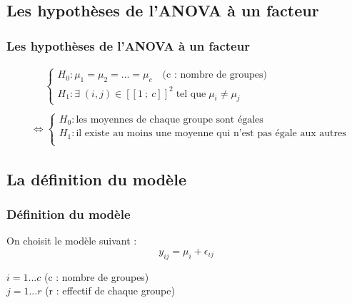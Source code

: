 \documentclass{beamer}
\begin{document}
\subsection{Les hypothèses de l'ANOVA à un facteur}
\begin{frame}
\frametitle{Les hypothèses de l'ANOVA à un facteur}

\begin{align*}
& \;\;\;\;\; \left\{\begin{array}{ll}
H_0 : \mu_1 = \mu_2 = ... = \mu_c \quad \text{(c : nombre de groupes)} \\ 
H_1 : \exists \; (i,j) \in  [\![1 ~;~ c]\!] ^2 \; \text{tel que} \; \mu_i \neq \mu_j
\end{array}\right. \\
& \\
& \Leftrightarrow \left\{\begin{array}{ll}
H_0 : \text{les moyennes de chaque groupe sont égales} \\
H_1 : \text{il existe au moins une moyenne qui n’est pas égale aux autres} \\
\end{array}\right.
\end{align*}
\end{frame}

\subsection{La définition du modèle}
\begin{frame}
\frametitle{Définition du modèle}
On choisit le modèle suivant :
\[ y_{ij}=\mu_i+\epsilon_{ij} \]

$i= 1...c$ (c : nombre de groupes) \\
$j= 1...r$ (r : effectif de chaque groupe)
\end{frame}
\end{document}
